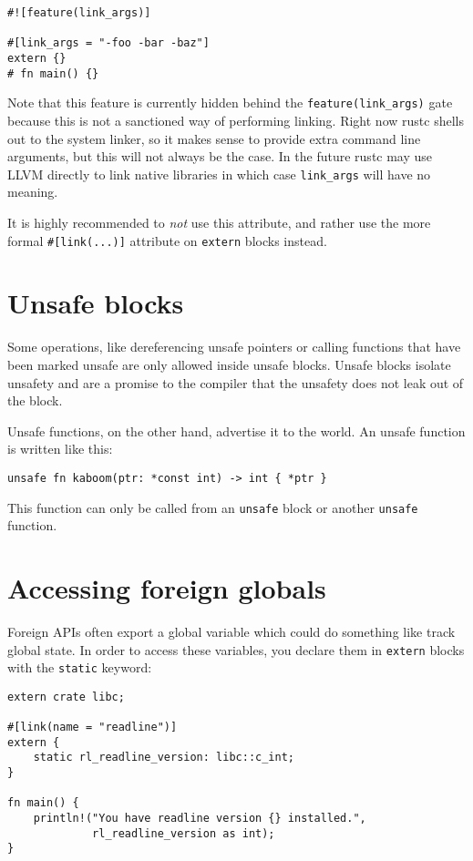 \documentclass[]{article}
\begin{document}
\begin{verbatim}
#![feature(link_args)]

#[link_args = "-foo -bar -baz"]
extern {}
# fn main() {}
\end{verbatim}

Note that this feature is currently hidden behind the
\texttt{feature(link\_args)} gate because this is not a sanctioned way
of performing linking. Right now rustc shells out to the system linker,
so it makes sense to provide extra command line arguments, but this will
not always be the case. In the future rustc may use LLVM directly to
link native libraries in which case \texttt{link\_args} will have no
meaning.

It is highly recommended to \emph{not} use this attribute, and rather
use the more formal \texttt{\#{[}link(...){]}} attribute on
\texttt{extern} blocks instead.

\section{Unsafe blocks}\label{unsafe-blocks}

Some operations, like dereferencing unsafe pointers or calling functions
that have been marked unsafe are only allowed inside unsafe blocks.
Unsafe blocks isolate unsafety and are a promise to the compiler that
the unsafety does not leak out of the block.

Unsafe functions, on the other hand, advertise it to the world. An
unsafe function is written like this:

\begin{verbatim}
unsafe fn kaboom(ptr: *const int) -> int { *ptr }
\end{verbatim}

This function can only be called from an \texttt{unsafe} block or
another \texttt{unsafe} function.

\section{Accessing foreign globals}\label{accessing-foreign-globals}

Foreign APIs often export a global variable which could do something
like track global state. In order to access these variables, you declare
them in \texttt{extern} blocks with the \texttt{static} keyword:

\begin{verbatim}
extern crate libc;

#[link(name = "readline")]
extern {
    static rl_readline_version: libc::c_int;
}

fn main() {
    println!("You have readline version {} installed.",
             rl_readline_version as int);
}
\end{verbatim}
\end{document}
